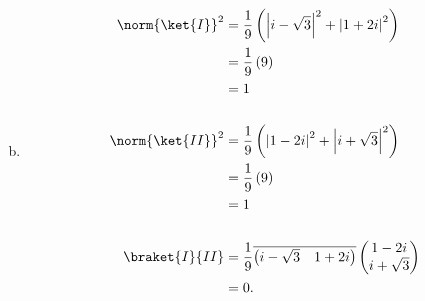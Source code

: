 \documentclass[10pt]{mypackage}
\begin{document}
\begin{enumerate}[(a)]
\begin{align*}
    \end{align*}
  \item 
    \begin{align*}
      \norm{\ket{I}}^2 &= \frac{1}{9}\left(\left\vert i-\sqrt{3} \right\vert^2 + \left\vert 1 + 2i \right\vert^2\right)\\
                       &= \frac{1}{9}\left(9\right)\\
                       &= 1\\
                       \\
      \norm{\ket{II}}^2 &= \frac{1}{9}\left(\left\vert 1 - 2i \right\vert^2 + \left\vert i + \sqrt{3} \right\vert^2\right)\\
                        &= \frac{1}{9}\left(9\right)\\
                        &= 1\\
                        \\
      \braket{I}{II} &= \frac{1}{9} \overline{ \begin{pmatrix}i - \sqrt{3} & 1 + 2i\end{pmatrix} } \begin{pmatrix}1-2i\\i + \sqrt{3}\end{pmatrix}\\
                     &= 0.
    \end{align*}
\end{enumerate}
\end{document}
